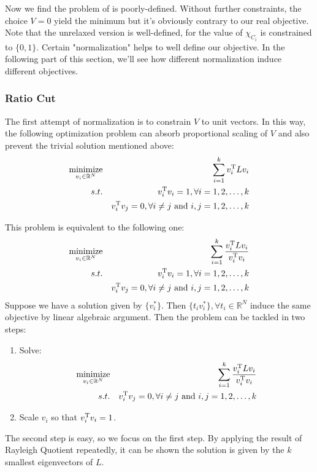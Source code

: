 Now we find the problem of \req{\ref{eq:cut_relax}} is poorly-defined. 
Without further constraints, the choice $ V=0 $ yield the minimum
but it's obviously contrary to our real objective. Note that the unrelaxed
version is well-defined, for the value of $ \chi_{C_i} $ is constrained 
to $ \{0,1\} $. Certain "normalization" helps to well define our objective. 
In the following part of this section, we'll see 
how different normalization induce different objectives. 

\subsubsection{Ratio Cut}	
\label{sec:rcut}

The first attempt of normalization is to constrain $ V $ 
to unit vectors. In this way, the following optimization 
problem can absorb proportional scaling of $ V $
and also prevent the trivial solution mentioned above:
\begin{eqnarray}
	\operatorname*{minimize}_{v_i \in \mathbb{R}^N} 
	&& { \sum_{i=1}^{k}{v_i^\mathrm{T}Lv_i} } \nonumber \\
	s.t. && v_i^\mathrm{T}v_i = 1, \forall i=1,2,\ldots,k \nonumber \\
		 && v_i^\mathrm{T}v_j = 0, \forall i \ne j \text{~and~} i,j=1,2,\ldots,k\label{eq:rcut_opt1}
\end{eqnarray}

This problem is equivalent to the following one:
\begin{eqnarray}
	\operatorname*{minimize}_{v_i \in \mathbb{R}^N} 
	&& { \sum_{i=1}^{k}{ \frac{v_i^\mathrm{T}Lv_i}{v_i^\mathrm{T}v_i} } } \nonumber \\
	s.t. && v_i^\mathrm{T}v_i = 1, \forall i=1,2,\ldots,k \nonumber \\
		 && v_i^\mathrm{T}v_j = 0, \forall i \ne j \text{~and~} i,j=1,2,\ldots,k\label{eq:rcut_opt2}
\end{eqnarray}
Suppose we have a solution given by $ \{v^*_i\} $. Then 
$ \{t_i v^*_i\}, \forall t_i \in \mathbb{R}^N $ induce the 
same objective by linear algebraic argument. Then the problem can be 
tackled in two steps:
\begin{enumerate}
	\item Solve: 
		\begin{eqnarray}
			\operatorname*{minimize}_{v_i \in \mathbb{R}^N} 
			&& { \sum_{i=1}^{k}{ \frac{v_i^\mathrm{T}Lv_i}{v_i^\mathrm{T}v_i} } } \nonumber \\
		 s.t. && v_i^\mathrm{T}v_j = 0, \forall i \ne j 
		 \text{~and~} i,j=1,2,\ldots,k\label{eq:rcut_opt3}
		\end{eqnarray}
	\item Scale $ v_i $ so that $ v_i^\mathrm{T}v_i = 1 $.
\end{enumerate}
The second step is easy, so we focus on the first step. 
By applying the result of Rayleigh Quotient
repeatedly\cite{lau-2012-spectral-ln}, it can be shown the solution 
is given by the $ k $ smallest eigenvectors of $ L $. 

